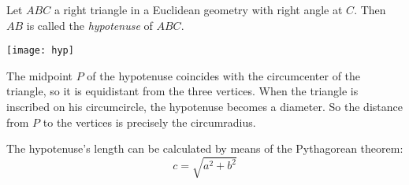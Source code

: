 \documentclass[12pt]{article}
\begin{document}
Let $ABC$ a right triangle in a Euclidean geometry with right angle at $C$. Then $AB$ is called the \emph{hypotenuse} of $ABC$.

\begin{center}
\texttt{[image: hyp]}
\end{center}

The midpoint $P$ of the hypotenuse coincides with the circumcenter of the triangle, so it is equidistant from the three vertices. When the triangle is inscribed on his circumcircle, the hypotenuse becomes a diameter. So the distance from $P$ to the vertices is precisely the circumradius.

The hypotenuse's length can be calculated by means of the Pythagorean theorem:
$$c=\sqrt{a^2+b^2}$$

\end{document}
